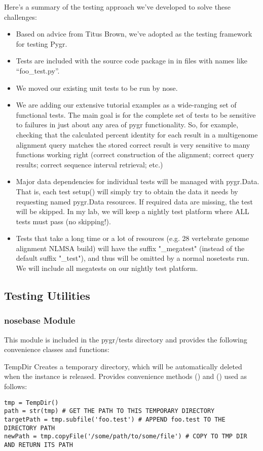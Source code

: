 \documentclass{howto}
\begin{document}
Here's a summary of the testing approach we've developed to solve these challenges:
\begin{itemize}
\item Based on advice from Titus Brown, we've adopted  as the testing
framework for testing Pygr.
\item Tests are included with the source code package
in  in files with names like ``foo_test.py''.
\item We moved our existing unit tests to be run by nose.
\item We are adding our extensive tutorial examples as a wide-ranging set of functional tests.  The main goal is for the complete set of tests to be sensitive to failures in just about any area of pygr functionality.  So, for example, checking that the calculated percent identity for each result in a multigenome alignment query matches the stored correct result is very sensitive to many functions working right (correct construction of the alignment; correct query results; correct sequence interval retrieval; etc.)
\item Major data dependencies for individual tests will be managed with pygr.Data.  That is, each test setup() will simply try to obtain the data it needs by requesting named pygr.Data resources.  If required data are missing, the test will be skipped.  In my lab, we will keep a nightly test platform where ALL tests must pass (no skipping!).
\item Tests that take a long time or a lot of resources (e.g. 28 vertebrate genome alignment NLMSA build) will have the suffix "_megatest" (instead of the default suffix "_test"), and thus will be omitted by a normal nosetests run.  We will include all megatests on our nightly test platform.  
\end{itemize}

\subsection{Testing Utilities}
\subsubsection{nosebase Module}
This module is included in the pygr/tests directory and provides the following
convenience classes and functions:
\begin{funcdesc}{TempDir}{}
  Creates a temporary directory, which will be automatically deleted
  when the  instance is released.  Provides convenience methods
  () and () used as follows:
\begin{verbatim}
tmp = TempDir()
path = str(tmp) # GET THE PATH TO THIS TEMPORARY DIRECTORY
targetPath = tmp.subfile('foo.test') # APPEND foo.test TO THE DIRECTORY PATH
newPath = tmp.copyFile('/some/path/to/some/file') # COPY TO TMP DIR AND RETURN ITS PATH
\end{verbatim}
\end{funcdesc}
\end{document}
